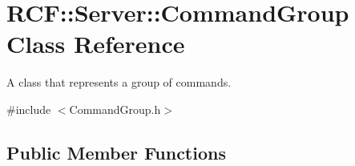 \hypertarget{class_r_c_f_1_1_server_1_1_command_group}{}\section{R\+C\+F\+:\+:Server\+:\+:Command\+Group Class Reference}
\label{class_r_c_f_1_1_server_1_1_command_group}


A class that represents a group of commands.  




{\ttfamily \#include $<$Command\+Group.\+h$>$}

\subsection*{Public Member Functions}
